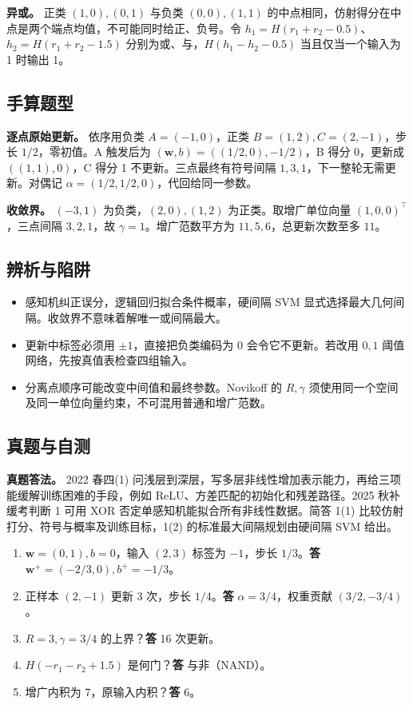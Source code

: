 \documentclass[UTF8,a4paper,zihao=-4,fontset=fandol]{ctexart}
\begin{document}
\textbf{异或。} 正类 \((1,0),(0,1)\) 与负类 \((0,0),(1,1)\) 的中点相同，仿射得分在中点是两个端点均值，不可能同时给正、负号。令 \(h_1=H(r_1+r_2-0.5)\)、\(h_2=H(r_1+r_2-1.5)\) 分别为或、与，\(H(h_1-h_2-0.5)\) 当且仅当一个输入为 1 时输出 1。

\subsection{手算题型}
\textbf{逐点原始更新。} 依序用负类 \(A=(-1,0)\)，正类 \(B=(1,2),C=(2,-1)\)，步长 \(1/2\)，零初值。A 触发后为 \((\bm w,b)=((1/2,0),-1/2)\)，B 得分 0，更新成 \(((1,1),0)\)，C 得分 1 不更新。三点最终有符号间隔 \(1,3,1\)，下一整轮无需更新。对偶记 \(\alpha=(1/2,1/2,0)\)，代回给同一参数。
 
\textbf{收敛界。} \((-3,1)\) 为负类，\((2,0),(1,2)\) 为正类。取增广单位向量 \((1,0,0)^\top\)，三点间隔 \(3,2,1\)，故 \(\gamma=1\)。增广范数平方为 \(11,5,6\)，总更新次数至多 \(11\)。

\subsection{辨析与陷阱}
\begin{itemize}[nosep,leftmargin=*]
\item 感知机纠正误分，逻辑回归拟合条件概率，硬间隔 SVM 显式选择最大几何间隔。收敛界不意味着解唯一或间隔最大。
\item 更新中标签必须用 \(\pm1\)，直接把负类编码为 \(0\) 会令它不更新。若改用 \(0,1\) 阈值网络，先按真值表检查四组输入。
\item 分离点顺序可能改变中间值和最终参数。Novikoff 的 \(R,\gamma\) 须使用同一个空间及同一单位向量约束，不可混用普通和增广范数。
\end{itemize}

\subsection{真题与自测}
\textbf{真题答法。} 2022 春四(1) 问浅层到深层，写多层非线性增加表示能力，再给三项能缓解训练困难的手段，例如 ReLU、方差匹配的初始化和残差路径。2025 秋补缓考判断 1 可用 XOR 否定单感知机能拟合所有非线性数据。简答 1(1) 比较仿射打分、符号与概率及训练目标，1(2) 的标准最大间隔规划由硬间隔 SVM 给出。
\begin{enumerate}[nosep,leftmargin=*]
\item \(\bm w=(0,1),b=0\)，输入 \((2,3)\) 标签为 \(-1\)，步长 \(1/3\)。\textbf{答} \(\bm w^+=(-2/3,0),b^+=-1/3\)。
\item 正样本 \((2,-1)\) 更新 3 次，步长 \(1/4\)。\textbf{答} \(\alpha=3/4\)，权重贡献 \((3/2,-3/4)\)。
\item \(R=3,\gamma=3/4\) 的上界？\textbf{答} 16 次更新。
\item \(H(-r_1-r_2+1.5)\) 是何门？\textbf{答} 与非（NAND）。
\item 增广内积为 7，原输入内积？\textbf{答} 6。
\end{enumerate}
\end{document}
